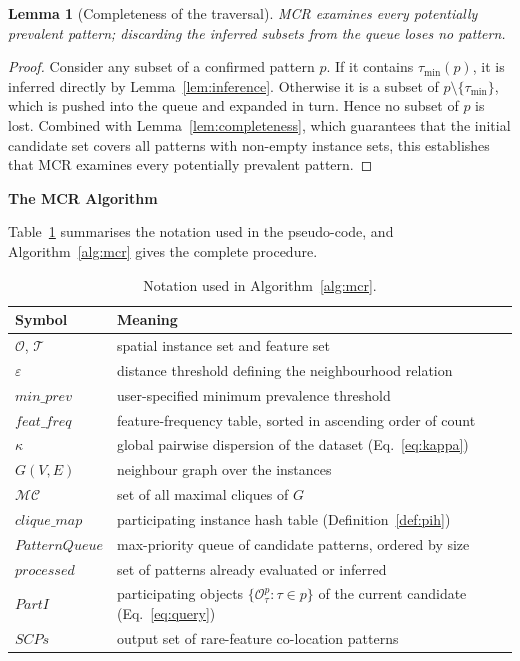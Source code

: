 \documentclass[12pt, letterpaper]{template}
\newtheorem{lemma}{Lemma}
\theoremstyle{definition}
\begin{document}
\begin{lemma}[Completeness of the traversal]
\label{lem:traversal_complete}
MCR examines every potentially prevalent pattern; discarding the inferred
subsets from the queue loses no pattern.
\end{lemma}

\begin{proof}
\renewcommand{\qedsymbol}{}
Consider any subset of a confirmed pattern $p$. If it contains
$\tau_{\min}(p)$, it is inferred directly by
Lemma~\ref{lem:inference}. Otherwise it is a subset of
$p \setminus \{\tau_{\min}\}$, which is pushed into the queue and expanded
in turn. Hence no subset of $p$ is lost. Combined with
Lemma~\ref{lem:completeness}, which guarantees that the initial candidate
set covers all patterns with non-empty instance sets, this establishes
that MCR examines every potentially prevalent pattern.
\end{proof}

\noindent\textbf{The MCR Algorithm}
\label{subsec:mcr_algorithm}

Table~\ref{tab:notation_mcr} summarises the notation used in the pseudo-code, and
Algorithm~\ref{alg:mcr} gives the complete procedure.

\begin{table}[H]
\centering
\caption{Notation used in Algorithm~\ref{alg:mcr}.}
\label{tab:notation_mcr}
\begin{tabularx}{\textwidth}{l X}
\hline
\textbf{Symbol} & \textbf{Meaning} \\
\hline
$\mathcal{O}$, $\mathcal{T}$ & spatial instance set and feature set \\
$\varepsilon$ & distance threshold defining the neighbourhood relation \\
$min\_prev$ & user-specified minimum prevalence threshold \\
$feat\_freq$ & feature-frequency table, sorted in ascending order of count \\
$\kappa$ & global pairwise dispersion of the dataset (Eq.~\ref{eq:kappa}) \\
$G(V,E)$ & neighbour graph over the instances \\
$\mathcal{MC}$ & set of all maximal cliques of $G$ \\
$clique\_map$ & participating instance hash table (Definition~\ref{def:pih}) \\
$PatternQueue$ & max-priority queue of candidate patterns, ordered by size \\
$processed$ & set of patterns already evaluated or inferred \\
$PartI$ & participating objects $\{\mathcal{O}_\tau^p : \tau \in p\}$ of the current candidate (Eq.~\ref{eq:query}) \\
$SCPs$ & output set of rare-feature co-location patterns \\
\hline
\end{tabularx}
\end{table}
\end{document}

